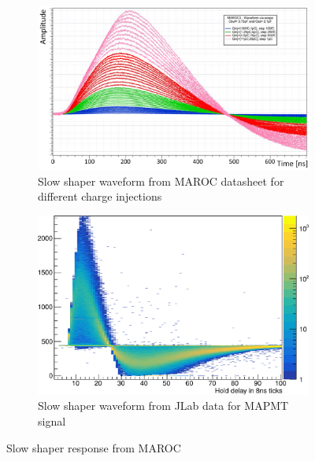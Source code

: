 \begin{figure}[hbt]
	\centering
	\begin{subfigure}{0.49\linewidth}
		\includegraphics[width=\linewidth]{figures/SlowWaveForm_MAROC.pdf}
		\caption{Slow shaper waveform from MAROC datasheet for different charge injections}
		\label{fig:slowMAROC}
	\end{subfigure}
	\begin{subfigure}{0.49\linewidth}
		\includegraphics[width=\linewidth]{figures/SlowWaveForm_RICH.pdf}
		\caption{Slow shaper waveform from JLab data for MAPMT signal}
		\label{fig:slowJLab}
	\end{subfigure}
	\caption{Slow shaper response from MAROC}
	\label{fig:slowWaveform}
\end{figure}



